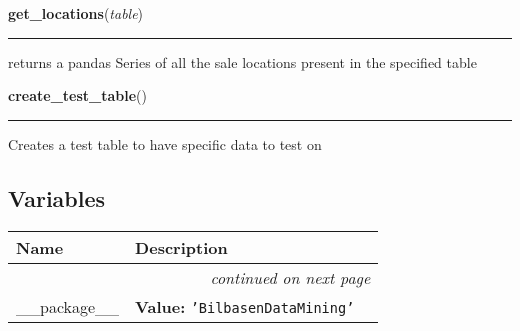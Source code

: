     \label{BilbasenDataMining:database:get_locations}

    \vspace{0.5ex}

\hspace{.8\funcindent}\begin{boxedminipage}{\funcwidth}

    \raggedright \textbf{get\_locations}(\textit{table})

    \vspace{-1.5ex}

    \rule{\textwidth}{0.5\fboxrule}
\setlength{\parskip}{2ex}
    returns a pandas Series of all the sale locations present in the 
    specified table

\setlength{\parskip}{1ex}
    \end{boxedminipage}

    \label{BilbasenDataMining:database:create_test_table}

    \vspace{0.5ex}

\hspace{.8\funcindent}\begin{boxedminipage}{\funcwidth}

    \raggedright \textbf{create\_test\_table}()

    \vspace{-1.5ex}

    \rule{\textwidth}{0.5\fboxrule}
\setlength{\parskip}{2ex}
    Creates a test table to have specific data to test on

\setlength{\parskip}{1ex}
    \end{boxedminipage}



  \subsection{Variables}

    \vspace{-1cm}
\hspace{\varindent}\begin{longtable}{|p{\varnamewidth}|p{\vardescrwidth}|l}
\cline{1-2}
\cline{1-2} \centering \textbf{Name} & \centering \textbf{Description}& \\
\cline{1-2}
\endhead\cline{1-2}\multicolumn{3}{r}{\small\textit{continued on next page}}\\\endfoot\cline{1-2}
\endlastfoot\raggedright \_\-\_\-p\-a\-c\-k\-a\-g\-e\-\_\-\_\- & \raggedright \textbf{Value:} 
{\tt \texttt{'}\texttt{BilbasenDataMining}\texttt{'}}&\\
\cline{1-2}
\end{longtable}

